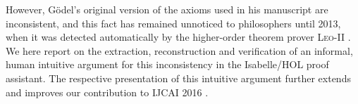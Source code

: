 \documentclass{llncs}
\begin{document}

However, G\"odel's original version of the axioms used in his
manuscript \cite{GoedelNotes} are inconsistent, and this fact has
remained unnoticed to philosophers until 2013, when it was detected
automatically by the higher-order theorem prover \textsc{Leo-II}
\cite{C40}.  We here report on the extraction, reconstruction and
verification of an informal, human intuitive argument for this
inconsistency in the Isabelle/HOL proof assistant.  The respective
presentation
of this intuitive argument further extends and improves our contribution 
to IJCAI 2016 \cite{C55}.


\end{document}
